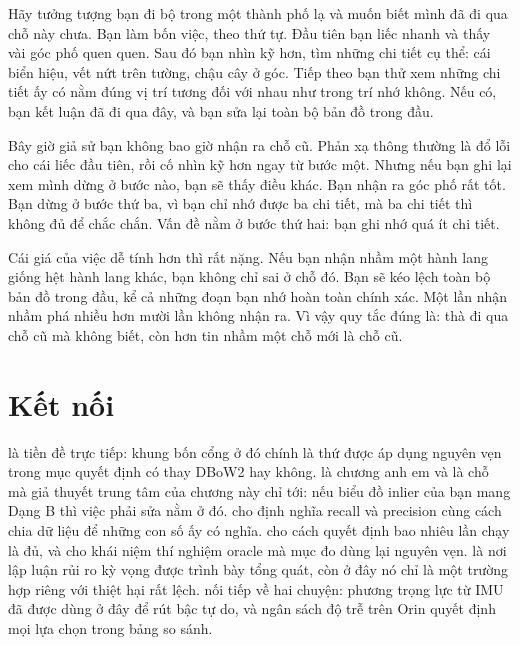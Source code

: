 \documentclass[../../deep_learning.tex]{subfiles}
\begin{document}
\begin{dongian}
Hãy tưởng tượng bạn đi bộ trong một thành phố lạ và muốn biết mình đã đi qua chỗ này chưa. Bạn làm bốn việc, theo thứ tự. Đầu tiên bạn liếc nhanh và thấy vài góc phố quen quen. Sau đó bạn nhìn kỹ hơn, tìm những chi tiết cụ thể: cái biển hiệu, vết nứt trên tường, chậu cây ở góc. Tiếp theo bạn thử xem những chi tiết ấy có nằm đúng vị trí tương đối với nhau như trong trí nhớ không. Nếu có, bạn kết luận đã đi qua đây, và bạn sửa lại toàn bộ bản đồ trong đầu.

Bây giờ giả sử bạn không bao giờ nhận ra chỗ cũ. Phản xạ thông thường là đổ lỗi cho cái liếc đầu tiên, rồi cố nhìn kỹ hơn ngay từ bước một. Nhưng nếu bạn ghi lại xem mình dừng ở bước nào, bạn sẽ thấy điều khác. Bạn nhận ra góc phố rất tốt. Bạn dừng ở bước thứ ba, vì bạn chỉ nhớ được ba chi tiết, mà ba chi tiết thì không đủ để chắc chắn. Vấn đề nằm ở bước thứ hai: bạn ghi nhớ quá ít chi tiết.

Cái giá của việc dễ tính hơn thì rất nặng. Nếu bạn nhận nhầm một hành lang giống hệt hành lang khác, bạn không chỉ sai ở chỗ đó. Bạn sẽ kéo lệch toàn bộ bản đồ trong đầu, kể cả những đoạn bạn nhớ hoàn toàn chính xác. Một lần nhận nhầm phá nhiều hơn mười lần không nhận ra. Vì vậy quy tắc đúng là: thà đi qua chỗ cũ mà không biết, còn hơn tin nhầm một chỗ mới là chỗ cũ.

\end{dongian}

\section{Kết nối}
 là tiền đề trực tiếp: khung bốn cổng ở đó chính là thứ được áp dụng nguyên vẹn trong mục quyết định có thay DBoW2 hay không.  là chương anh em và là chỗ mà giả thuyết trung tâm của chương này chỉ tới: nếu biểu đồ inlier của bạn mang Dạng B thì việc phải sửa nằm ở đó.  cho định nghĩa recall và precision cùng cách chia dữ liệu để những con số ấy có nghĩa.  cho cách quyết định bao nhiêu lần chạy là đủ, và cho khái niệm thí nghiệm oracle mà mục đo dùng lại nguyên vẹn.  là nơi lập luận rủi ro kỳ vọng được trình bày tổng quát, còn ở đây nó chỉ là một trường hợp riêng với thiệt hại rất lệch.  nối tiếp về hai chuyện: phương trọng lực từ IMU đã được dùng ở đây để rút bậc tự do, và ngân sách độ trễ trên Orin quyết định mọi lựa chọn trong bảng so sánh.
\end{document}
